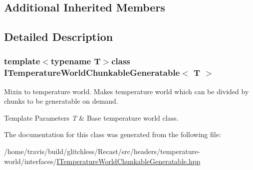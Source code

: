\subsection*{Additional Inherited Members}


\subsection{Detailed Description}
\subsubsection*{template$<$typename T$>$class I\-Temperature\-World\-Chunkable\-Generatable$<$ T $>$}

Mixin to temperature world. Makes temperature world which can be divided by chunks to be generatable on demand.


\begin{DoxyTemplParams}{Template Parameters}
{\em T} & Base temperature world class. \\
\hline
\end{DoxyTemplParams}


The documentation for this class was generated from the following file\-:\begin{DoxyCompactItemize}
\item 
/home/travis/build/glitchless/\-Recast/src/headers/temperature-\/world/interfaces/\hyperlink{_i_temperature_world_chunkable_generatable_8hpp}{I\-Temperature\-World\-Chunkable\-Generatable.\-hpp}\end{DoxyCompactItemize}
